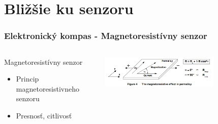 \section{Bližšie ku senzoru}
\begin{snimka}
 \frametitle{Elektronický kompas - Magnetoresistívny senzor}
   \begin{columns}[c]
    \begin{column}{0.4\textwidth}
    \begin{block}{Magnetoresistívny senzor}
    \begin{itemize}
         \item Princip magnetoresistivneho senzoru
         \item Presnosť, citlivosť
     \end{itemize}
  \end{block}
   \end{column}
    \begin{column}{0.6\textwidth}
     \begin{center}
        \includegraphics[width=0.7\textwidth]{obr/princip.jpg}
      \end{center}
    \end{column}
  \end{columns}
\end{snimka}
